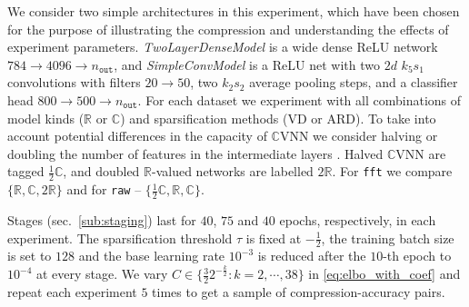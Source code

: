 \documentclass[a4paper,10pt,twocolumn]{article}
\newcommand{\real}{\mathbb{R}}
\newcommand{\cplx}{\mathbb{C}}
\begin{document}
We consider two simple architectures in this experiment, which have been chosen for
the purpose of illustrating the compression and understanding the effects of experiment
parameters. \emph{TwoLayerDenseModel} is a wide dense ReLU network $
  784 \to 4096 \to n_\mathtt{out}
$, and \emph{SimpleConvModel} is a ReLU net with two $2d$ $k_5 s_1$ convolutions with
filters $20 \to 50$, two $k_2 s_2$ average pooling steps, and a classifier head
$800 \to 500 \to n_\mathtt{out}$.
%
For each dataset we experiment with all combinations of model kinds ($\real$ or $\cplx$)
and sparsification methods (VD or ARD). To take into account potential differences in
the capacity of $\cplx$VNN we consider halving or doubling the number of features in
the intermediate layers \citep{monning_evaluation_2018}. Halved $\cplx$VNN are tagged
$\tfrac12\cplx$, and doubled $\real$-valued networks are labelled $2\real$. For \texttt{fft}
we compare $\{\real, \cplx, 2\real\}$ and for \texttt{raw} -- $\{\tfrac12\cplx, \real, \cplx\}$.

Stages (sec.~\ref{sub:staging}) last for $40$, $75$ and $40$ epochs, respectively, in each
experiment. The sparsification threshold $\tau$ is fixed at $-\tfrac12$, the training batch
size is set to $128$ and the base learning rate ${10}^{-3}$ is reduced after the $10$-th
epoch to ${10}^{-4}$ at every stage.
%
We vary $
  C \in \{
    \tfrac32 2^{-\tfrac{k}2} \colon k=2, \cdots, 38
  \}
$ in \eqref{eq:elbo_with_coef} and repeat each experiment $5$ times to get a sample
of compression-accuracy pairs.
\end{document}
